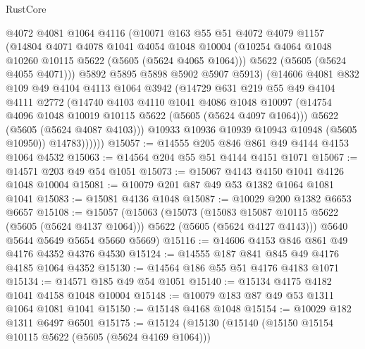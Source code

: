 \begin{lexlean}{RustCore}
\begin{coremodule}
              @4072
              @4081
              @1064
              @4116
              (@10071
                @163
                @55
                @51
                @4072
                @4079
                @1157
                (@14804
                  @4071
                  @4078
                  @1041
                  @4054
                  @1048
                  @10004
                  (@10254 @4064 @1048 @10260 @10115 @5622 (@5605 (@5624 @4065 @1064)))
                  @5622
                  (@5605 (@5624 @4055 @4071)))
                @5892
                @5895
                @5898
                @5902
                @5907
                @5913)
              (@14606
                @4081
                @832
                @109
                @49
                @4104
                @4113
                @1064
                @3942
                (@14729
                  @631
                  @219
                  @55
                  @49
                  @4104
                  @4111
                  @2772
                  (@14740
                    @4103
                    @4110
                    @1041
                    @4086
                    @1048
                    @10097
                    (@14754 @4096 @1048 @10019 @10115 @5622 (@5605 (@5624 @4097 @1064)))
                    @5622
                    (@5605 (@5624 @4087 @4103)))
                  @10933
                  @10936
                  @10939
                  @10943
                  @10948
                  (@5605 @10950))
                @14783))))))
@15057 := @14555 @205 @846 @861 @49 @4144 @4153 @1064 @4532
@15063 := @14564 @204 @55 @51 @4144 @4151 @1071
@15067 := @14571 @203 @49 @54 @1051
@15073 := @15067 @4143 @4150 @1041 @4126 @1048 @10004
@15081 := @10079 @201 @87 @49 @53 @1382 @1064 @1081 @1041
@15083 := @15081 @4136 @1048
@15087 := @10029 @200 @1382 @6653 @6657
@15108 := @15057
    (@15063
      (@15073
        (@15083 @15087 @10115 @5622 (@5605 (@5624 @4137 @1064)))
        @5622
        (@5605 (@5624 @4127 @4143)))
      @5640
      @5644
      @5649
      @5654
      @5660
      @5669)
@15116 := @14606 @4153 @846 @861 @49 @4176 @4352 @4376 @4530
@15124 := @14555 @187 @841 @845 @49 @4176 @4185 @1064 @4352
@15130 := @14564 @186 @55 @51 @4176 @4183 @1071
@15134 := @14571 @185 @49 @54 @1051
@15140 := @15134 @4175 @4182 @1041 @4158 @1048 @10004
@15148 := @10079 @183 @87 @49 @53 @1311 @1064 @1081 @1041
@15150 := @15148 @4168 @1048
@15154 := @10029 @182 @1311 @6497 @6501
@15175 := @15124
    (@15130
      (@15140
        (@15150 @15154 @10115 @5622 (@5605 (@5624 @4169 @1064)))

\end{coremodule}
\end{lexlean}
